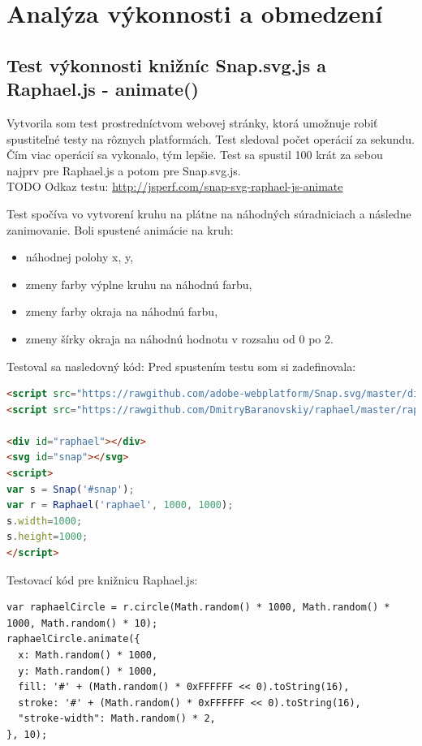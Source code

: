 \chapter{Analýza výkonnosti a obmedzení }


\section{Test výkonnosti knižníc Snap.svg.js a Raphael.js - animate()}

Vytvorila som test prostredníctvom webovej stránky, ktorá umožnuje robiť spustiteľné testy na rôznych platformách. Test sledoval počet operácií za sekundu. Čím viac operácií sa vykonalo, tým lepšie. Test sa spustil 100 krát za sebou najprv pre Raphael.js a potom pre Snap.svg.js. 
\\TODO Odkaz testu: \url{http://jsperf.com/snap-svg-raphael-js-animate}
 


Test spočíva vo vytvorení kruhu na plátne na náhodných súradniciach a následne zanimovanie. Boli spustené animácie na kruh: 
\begin{itemize} \item náhodnej polohy x, y, 
\item zmeny farby výplne kruhu na náhodnú farbu, 
\item zmeny farby okraja na náhodnú farbu, 
\item zmeny šírky okraja na náhodnú hodnotu v rozsahu od 0 po 2. 
\end{itemize}
Testoval sa nasledovný kód: 
Pred spustením testu som si zadefinovala: 
\begin{lstlisting}[language = html]
<script src="https://rawgithub.com/adobe-webplatform/Snap.svg/master/dist/snap.svg.js"></script>
<script src="https://rawgithub.com/DmitryBaranovskiy/raphael/master/raphael.js"></script>

<div id="raphael"></div>
<svg id="snap"></svg>
<script>
var s = Snap('#snap');
var r = Raphael('raphael', 1000, 1000);
s.width=1000;
s.height=1000;
</script>
\end{lstlisting}

Testovací kód pre knižnicu Raphael.js:
\begin{lstlisting}
var raphaelCircle = r.circle(Math.random() * 1000, Math.random() * 1000, Math.random() * 10);
raphaelCircle.animate({
  x: Math.random() * 1000,
  y: Math.random() * 1000,
  fill: '#' + (Math.random() * 0xFFFFFF << 0).toString(16),
  stroke: '#' + (Math.random() * 0xFFFFFF << 0).toString(16),
  "stroke-width": Math.random() * 2,
}, 10);
\end{lstlisting}


